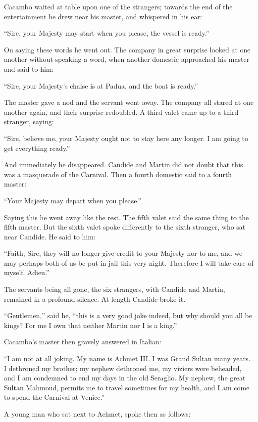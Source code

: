 Cacambo waited at table upon one of the strangers; towards the end of the entertainment he drew near his master, and whispered in his ear:

``Sire, your Majesty may start when you please, the vessel is ready.''

On saying these words he went out. The company in great surprise looked at one another without speaking a word, when another domestic approached his master and said to him:

``Sire, your Majesty's chaise is at Padua, and the boat is ready.''

The master gave a nod and the servant went away. The company all stared at one another again, and their surprise redoubled. A third valet came up to a third stranger, saying:

``Sire, believe me, your Majesty ought not to stay here any longer. I am going to get everything ready.''

And immediately he disappeared. Candide and Martin did not doubt that this was a masquerade of the Carnival. Then a fourth domestic said to a fourth master:

``Your Majesty may depart when you please.''

Saying this he went away like the rest. The fifth valet said the same thing to the fifth master. But the sixth valet spoke differently to the sixth stranger, who sat near Candide. He said to him:

``Faith, Sire, they will no longer give credit to your Majesty nor to me, and we may perhaps both of us be put in jail this very night. Therefore I will take care of myself. Adieu.''

The servants being all gone, the six strangers, with Candide and Martin, remained in a profound silence. At length Candide broke it.

``Gentlemen,'' said he, ``this is a very good joke indeed, but why should you all be kings? For me I own that neither Martin nor I is a king.''

Cacambo's master then gravely answered in Italian:

``I am not at all joking. My name is Achmet III. I was Grand Sultan many years. I dethroned my brother; my nephew dethroned me, my viziers were beheaded, and I am condemned to end my days in the old Seraglio. My nephew, the great Sultan Mahmoud, permits me to travel sometimes for my health, and I am come to spend the Carnival at Venice.''

A young man who sat next to Achmet, spoke then as follows:

